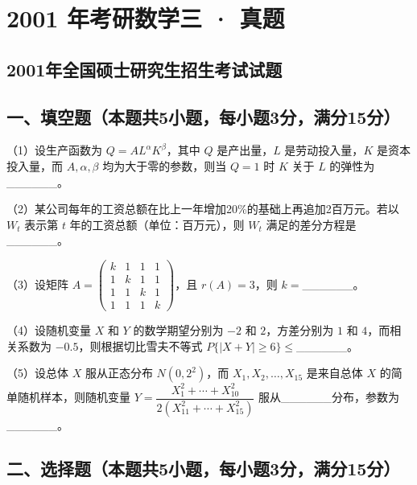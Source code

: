 \documentclass[UTF8,12pt]{ctexart}
\begin{document}
\section*{2001 年考研数学三 · 真题}
\subsection*{2001年全国硕士研究生招生考试试题}

\subsection*{一、填空题（本题共5小题，每小题3分，满分15分）}

（1）设生产函数为 \(\displaystyle Q=AL^\alpha K^\beta\)，其中 \(\displaystyle Q\) 是产出量，\(\displaystyle L\) 是劳动投入量，\(\displaystyle K\) 是资本投入量，而 \(\displaystyle A,\allowbreak \alpha,\allowbreak \beta\) 均为大于零的参数，则当 \(\displaystyle Q=1\) 时 \(\displaystyle K\) 关于 \(\displaystyle L\) 的弹性为\_\_\_\_\_\_。


（2）某公司每年的工资总额在比上一年增加20\%的基础上再追加2百万元。若以 \(\displaystyle W_t\) 表示第 \(\displaystyle t\) 年的工资总额（单位：百万元），则 \(\displaystyle W_t\) 满足的差分方程是\_\_\_\_\_\_。


（3）设矩阵 \(\displaystyle A=\begin{pmatrix}k&1&1&1\\1&k&1&1\\1&1&k&1\\1&1&1&k\end{pmatrix}\)，且 \(\displaystyle r(A)=3\)，则 \(\displaystyle k=\)\_\_\_\_\_\_。


（4）设随机变量 \(\displaystyle X\) 和 \(\displaystyle Y\) 的数学期望分别为 \(\displaystyle -2\) 和 \(\displaystyle 2\)，方差分别为 \(\displaystyle 1\) 和 \(\displaystyle 4\)，而相关系数为 \(\displaystyle -0.5\)，则根据切比雪夫不等式 \(\displaystyle P\{|X+Y|\ge6\}\le\)\_\_\_\_\_\_。


（5）设总体 \(\displaystyle X\) 服从正态分布 \(\displaystyle N(0,\allowbreak 2^2)\)，而 \(\displaystyle X_1,\allowbreak X_2,\allowbreak \ldots,\allowbreak X_{15}\) 是来自总体 \(\displaystyle X\) 的简单随机样本，则随机变量 \(\displaystyle Y=\dfrac{\displaystyle X_1^2+\cdots+X_{10}^2}{\displaystyle 2(X_{11}^2+\cdots+X_{15}^2)}\) 服从\_\_\_\_\_\_分布，参数为\_\_\_\_\_\_。


\subsection*{二、选择题（本题共5小题，每小题3分，满分15分）}
\end{document}
